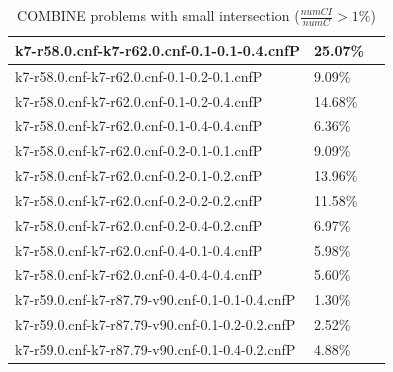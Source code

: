 \documentclass[12pt,a4paper,twoside]{scrartcl}
\numberwithin{equation}{section}
\begin{document}
\begin{table}[H]
\begin{center}
\begin{tabular}{|l|l|p{1cm}|}
k7-r58.0.cnf-k7-r62.0.cnf-0.1-0.1-0.4.cnfP&	25.07\%\\  \hline
k7-r58.0.cnf-k7-r62.0.cnf-0.1-0.2-0.1.cnfP&	9.09\%\\  \hline
k7-r58.0.cnf-k7-r62.0.cnf-0.1-0.2-0.4.cnfP&	14.68\%\\  \hline
k7-r58.0.cnf-k7-r62.0.cnf-0.1-0.4-0.4.cnfP&	6.36\%\\  \hline
k7-r58.0.cnf-k7-r62.0.cnf-0.2-0.1-0.1.cnfP&	9.09\%\\  \hline
k7-r58.0.cnf-k7-r62.0.cnf-0.2-0.1-0.2.cnfP&	13.96\%\\  \hline
k7-r58.0.cnf-k7-r62.0.cnf-0.2-0.2-0.2.cnfP&	11.58\%\\  \hline
k7-r58.0.cnf-k7-r62.0.cnf-0.2-0.4-0.2.cnfP&	6.97\%\\  \hline
k7-r58.0.cnf-k7-r62.0.cnf-0.4-0.1-0.4.cnfP&	5.98\%\\  \hline
k7-r58.0.cnf-k7-r62.0.cnf-0.4-0.4-0.4.cnfP&	5.60\%\\  \hline
k7-r59.0.cnf-k7-r87.79-v90.cnf-0.1-0.1-0.4.cnfP&	1.30\%\\  \hline
k7-r59.0.cnf-k7-r87.79-v90.cnf-0.1-0.2-0.2.cnfP&	2.52\%\\  \hline
k7-r59.0.cnf-k7-r87.79-v90.cnf-0.1-0.4-0.2.cnfP&	4.88\%\\  \hline
\end{tabular}
 \caption[Caption for LOF]{COMBINE problems with small intersection ($\frac{numCI}{numC} > 1\%$)\footnotemark}
\end{center}
\end{table} 
\end{document}
